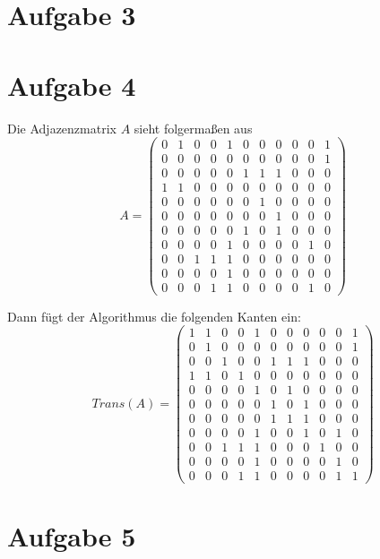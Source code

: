 \documentclass[10pt,a4paper]{article}
\begin{document}
\section{Aufgabe 3}

\section{Aufgabe 4}
Die Adjazenzmatrix $A$ sieht folgermaßen aus
\setcounter{MaxMatrixCols}{20}
\begin{equation}
  A =
  \begin{pmatrix}
    0 & 1 & 0 & 0 & 1 & 0 & 0 & 0 & 0 & 0 & 1\\
    0 & 0 & 0 & 0 & 0 & 0 & 0 & 0 & 0 & 0 & 1\\
    0 & 0 & 0 & 0 & 0 & 1 & 1 & 1 & 0 & 0 & 0\\
    1 & 1 & 0 & 0 & 0 & 0 & 0 & 0 & 0 & 0 & 0\\
    0 & 0 & 0 & 0 & 0 & 0 & 1 & 0 & 0 & 0 & 0\\
    0 & 0 & 0 & 0 & 0 & 0 & 0 & 1 & 0 & 0 & 0\\
    0 & 0 & 0 & 0 & 0 & 1 & 0 & 1 & 0 & 0 & 0\\
    0 & 0 & 0 & 0 & 1 & 0 & 0 & 0 & 0 & 1 & 0\\
    0 & 0 & 1 & 1 & 1 & 0 & 0 & 0 & 0 & 0 & 0\\
    0 & 0 & 0 & 0 & 1 & 0 & 0 & 0 & 0 & 0 & 0\\
    0 & 0 & 0 & 1 & 1 & 0 & 0 & 0 & 0 & 1 & 0
  \end{pmatrix}
\end{equation}

Dann fügt der Algorithmus die folgenden Kanten ein:
\begin{equation}
  Trans(A) =
  \begin{pmatrix}
    1 & 1 & 0 & 0 & 1 & 0 & 0 & 0 & 0 & 0 & 1\\
    0 & 1 & 0 & 0 & 0 & 0 & 0 & 0 & 0 & 0 & 1\\
    0 & 0 & 1 & 0 & 0 & 1 & 1 & 1 & 0 & 0 & 0\\
    1 & 1 & 0 & 1 & 0 & 0 & 0 & 0 & 0 & 0 & 0\\
    0 & 0 & 0 & 0 & 1 & 0 & 1 & 0 & 0 & 0 & 0\\
    0 & 0 & 0 & 0 & 0 & 1 & 0 & 1 & 0 & 0 & 0\\
    0 & 0 & 0 & 0 & 0 & 1 & 1 & 1 & 0 & 0 & 0\\
    0 & 0 & 0 & 0 & 1 & 0 & 0 & 1 & 0 & 1 & 0\\
    0 & 0 & 1 & 1 & 1 & 0 & 0 & 0 & 1 & 0 & 0\\
    0 & 0 & 0 & 0 & 1 & 0 & 0 & 0 & 0 & 1 & 0\\
    0 & 0 & 0 & 1 & 1 & 0 & 0 & 0 & 0 & 1 & 1
  \end{pmatrix}
\end{equation}

\section{Aufgabe 5}
\end{document}

